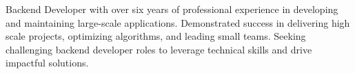 
Backend Developer with over six years of professional experience in developing and maintaining large-scale applications. Demonstrated success in delivering high scale projects, optimizing algorithms, and leading small teams. Seeking challenging backend developer roles to leverage technical skills and drive impactful solutions.

